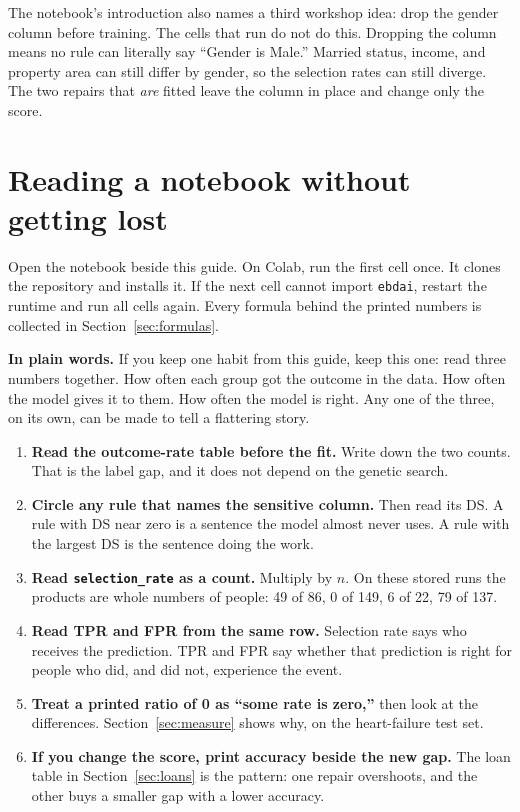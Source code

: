 \documentclass[11pt]{article}
\newcommand{\fn}[1]{\texttt{\small #1}}
\begin{document}
The notebook's introduction also names a third workshop idea: drop the gender column before training. The cells that run do not do this. Dropping the column means no rule can literally say ``Gender is Male.'' Married status, income, and property area can still differ by gender, so the selection rates can still diverge. The two repairs that \emph{are} fitted leave the column in place and change only the score.

\section{Reading a notebook without getting lost}
\label{sec:howto}

Open the notebook beside this guide. On Colab, run the first cell once. It clones the repository and installs it. If the next cell cannot import \fn{ebdai}, restart the runtime and run all cells again. Every formula behind the printed numbers is collected in Section~\ref{sec:formulas}.

\begin{plainwords}
\textbf{In plain words.} If you keep one habit from this guide, keep this one: read three numbers together. How often each group got the outcome in the data. How often the model gives it to them. How often the model is right. Any one of the three, on its own, can be made to tell a flattering story.
\end{plainwords}

\begin{enumerate}
  \item \textbf{Read the outcome-rate table before the fit.} Write down the two counts. That is the label gap, and it does not depend on the genetic search.
  \item \textbf{Circle any rule that names the sensitive column.} Then read its DS. A rule with DS near zero is a sentence the model almost never uses. A rule with the largest DS is the sentence doing the work.
  \item \textbf{Read \fn{selection\_rate} as a count.} Multiply by \(n\). On these stored runs the products are whole numbers of people: 49 of 86, 0 of 149, 6 of 22, 79 of 137.
  \item \textbf{Read TPR and FPR from the same row.} Selection rate says who receives the prediction. TPR and FPR say whether that prediction is right for people who did, and did not, experience the event.
  \item \textbf{Treat a printed ratio of 0 as ``some rate is zero,''} then look at the differences. Section~\ref{sec:measure} shows why, on the heart-failure test set.
  \item \textbf{If you change the score, print accuracy beside the new gap.} The loan table in Section~\ref{sec:loans} is the pattern: one repair overshoots, and the other buys a smaller gap with a lower accuracy.
\end{enumerate}
\end{document}
